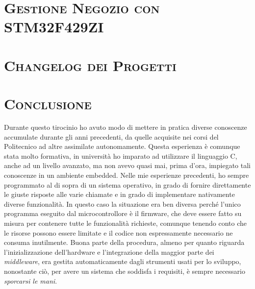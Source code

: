 \documentclass[a4paper,12pt]{article}
\begin{document}
\newpage

\section{\textsc{Gestione Negozio con STM32F429ZI}}



\newpage

\section{\textsc{Changelog dei Progetti}}



\newpage

\section{\textsc{Conclusione}}

Durante questo tirocinio ho avuto modo di mettere in pratica diverse conoscenze accumulate durante gli anni precedenti, da quelle acquisite nei corsi del Politecnico ad altre assimilate autonomamente. Questa esperienza \`e comunque stata molto formativa, in universit\`a ho imparato ad utilizzare il linguaggio C, anche ad un livello avanzato, ma non avevo quasi mai, prima d'ora, impiegato tali conoscenze in un ambiente embedded. Nelle mie esperienze precedenti, ho sempre programmato al di sopra di un sistema operativo, in grado di fornire direttamente le giuste risposte alle varie chiamate e in grado di implementare nativamente diverse funzionalit\`a. In questo caso la situazione era ben diversa perch\'e l'unico programma eseguito dal microcontrollore \`e il firmware, che deve essere fatto su misura per contenere tutte le funzionalit\`a richieste, comunque tenendo conto che le risorse possono essere limitate e il codice non espressamente necessario ne consuma inutilmente. Buona parte della procedura, almeno per quanto riguarda l'inizializzazione dell'hardware e l'integrazione della maggior parte dei \textit{middleware}, era gestita automaticamente dagli strumenti usati per lo sviluppo, nonostante ci\`o, per avere un sistema che soddisfa i requisiti, \`e sempre necessario \textit{sporcarsi le mani}.
\end{document}

